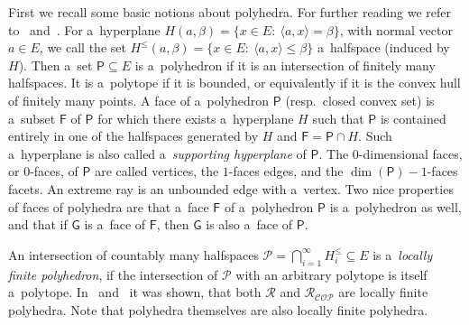 \documentclass{commat}
\newcommand{\sR}{\mathcal{R}}
\newcommand{\cop}{{\mathcal{COP}}}
\newcommand{\lfp}{\mathcal{P}}
\newcommand{\polyh}{\mathsf{P}}
\newcommand{\pfacef}{\mathsf{F}}
\newcommand{\pfaceg}{\mathsf{G}}
\begin{document}
First we recall some basic notions about polyhedra.
For further reading we refer to~\cite{barvinok-2002} and~\cite{ziegler-1995}.
For a~hyperplane \(H(a, \beta) = \{x\in E:\ \langle a, x \rangle = \beta \} \), with normal vector
\(a\in E \), we call the set
\(H^{\leq}(a, \beta)= \{ x\in E:\ \langle a, x \rangle \leq \beta \} \) a~halfspace (induced by $H$).
Then a~set \(\polyh \subseteq E \) is a~polyhedron if it is an intersection of finitely many halfspaces.
It is a~polytope if it is bounded, or equivalently if it is the convex hull of finitely many points.
A face of a~polyhedron \(\polyh \) (resp.\ closed convex set) is a~subset \(\pfacef \) of
\(\polyh \) for which there exists a~hyperplane $H$ such that \(\polyh \) is contained entirely
in one of the halfspaces generated by $H$ and \(\pfacef=\polyh\cap H \).
Such a~hyperplane is also called a~\emph{supporting hyperplane} of \(\polyh \).
The $0$-dimensional faces, or $0$-faces, of \(\polyh \) are called vertices, the $1$-faces
edges, and the \(\dim(\polyh)-1 \)-faces facets.
An extreme ray is an unbounded edge with a~vertex.
Two nice properties of faces of polyhedra are that a~face \(\pfacef \) of a~polyhedron \(\polyh \)
is a~polyhedron as well, and that if \(\pfaceg \) is a~face of \(\pfacef \),
then \(\pfaceg \) is also a~face of \(\polyh \).

An intersection of countably many halfspaces \(\lfp = \bigcap_{i=1}^{\infty}H_i^{\leq}\subseteq E \)
is a~\emph{locally finite polyhedron}, if the intersection of \(\lfp \) with an arbitrary polytope
is itself a~polytope.
In~\cite[Theorem 3.1]{schuermann-2009} and~\cite[Lemma 2.4]{dsv-2017} it was shown, that both
\(\sR \) and \(\sR_\cop \) are locally finite polyhedra.
Note that polyhedra themselves are also locally finite polyhedra.
\end{document}
